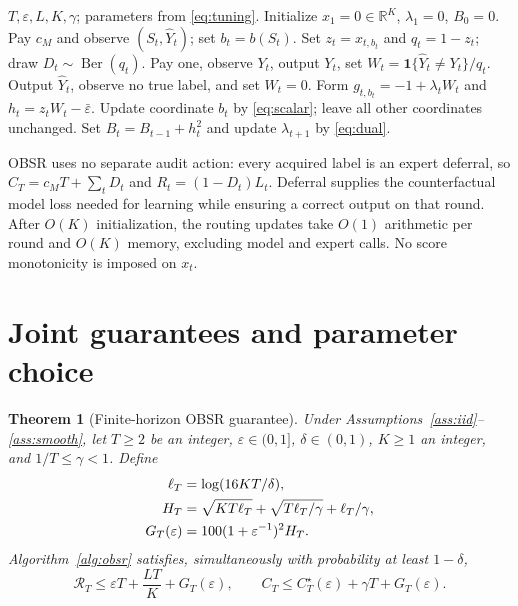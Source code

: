 \documentclass[11pt]{article}
\newtheorem{theorem}{Theorem}[section]
\theoremstyle{remark}
\newcommand{\ind}{\mathbf 1}
\newcommand{\Ber}{\operatorname{Ber}}
\newcommand{\calR}{\mathcal R}
\newcommand{\eps}{\varepsilon}
\begin{document}
\begin{algorithm}[tbp]
\caption{OBSR: one-sided barrier saddle routing}
\label{alg:obsr}
\begin{algorithmic}[1]
\Require $T,\eps,L,K,\gamma$; parameters from \eqref{eq:tuning}.
\State Initialize $x_1=0\in\mathbb R^K$, $\lambda_1=0$, $B_0=0$.
 \State Pay $c_M$ and observe $(S_t,\widehat Y_t)$; set $b_t=b(S_t)$.
 \State Set $z_t=x_{t,b_t}$ and $q_t=1-z_t$; draw $D_t\sim\Ber(q_t)$.
  \State Pay one, observe $Y_t$, output $Y_t$, set $W_t=\ind\{\widehat Y_t\ne Y_t\}/q_t$.
 \Else
  \State Output $\widehat Y_t$, observe no true label, and set $W_t=0$.
 \EndIf
 \State Form $g_{t,b_t}=-1+\lambda_tW_t$ and $h_t=z_tW_t-\bar\eps$.
 \State Update coordinate $b_t$ by \eqref{eq:scalar}; leave all other coordinates unchanged.
 \State Set $B_t=B_{t-1}+h_t^2$ and update $\lambda_{t+1}$ by \eqref{eq:dual}.
\EndFor
\end{algorithmic}
\end{algorithm}

OBSR uses no separate audit action: every acquired label is an expert
deferral, so $C_T=c_MT+\sum_tD_t$ and $R_t=(1-D_t)L_t$.
Deferral supplies the counterfactual model loss needed for learning while
ensuring a correct output on that round. After $O(K)$ initialization, the routing
updates take $O(1)$ arithmetic per round and $O(K)$ memory, excluding
model and expert calls. No score monotonicity is imposed on $x_t$.

\section{Joint guarantees and parameter choice}
\label{sec:upper-results}

\begin{theorem}[Finite-horizon OBSR guarantee]
\label{thm:upper}
Under Assumptions~\ref{ass:iid}--\ref{ass:smooth}, let $T\ge2$ be an
integer, $\eps\in(0,1]$, $\delta\in(0,1)$, $K\ge1$ an integer, and
$1/T\le\gamma<1$. Define
\begin{align}
 \ell_T&=\log(16KT/\delta),\notag\\
 H_T&=\sqrt{KT\ell_T}+\sqrt{T\ell_T/\gamma}+\ell_T/\gamma,\notag\\
 G_T(\eps)&=100(1+\eps^{-1})^2H_T.
 \label{eq:remainder}
\end{align}
Algorithm~\ref{alg:obsr} satisfies, simultaneously with probability at
least $1-\delta$,
\begin{equation}
 \calR_T\le\eps T+\frac{LT}{K}+G_T(\eps),\qquad
 C_T\le C_T^\star(\eps)+\gamma T+G_T(\eps).
 \label{eq:upper}
\end{equation}
\end{theorem}
\end{document}
